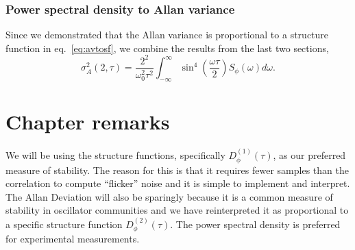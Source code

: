 \subsubsection*{Power spectral density to Allan variance}
%
Since we demonstrated that the Allan variance is proportional to a structure function in eq.~\ref{eq:avtosf}, we combine the results from the last two sections,
%
\begin{equation}
\sigma_A^2(2,\tau) = \frac{2^2}{\omega_0^2\tau^2} \int_{-\infty}^{\infty} \sin^4\left( \frac{\omega\tau}{2} \right) S_\phi(\omega) d\omega.
\end{equation}

\section{Chapter remarks} \label{sec:2conc}
%
We will be using the structure functions, specifically $D^{(1)}_\phi(\tau)$, as our preferred measure of stability. The reason for this is that it requires fewer samples than the correlation to compute ``flicker'' noise and it is simple to implement and interpret. The Allan Deviation will also be sparingly because it is a common measure of stability in oscillator communities and we have reinterpreted it as proportional to a specific structure function $D_\phi^{(2)}(\tau)$. The power spectral density is preferred for experimental measurements.

